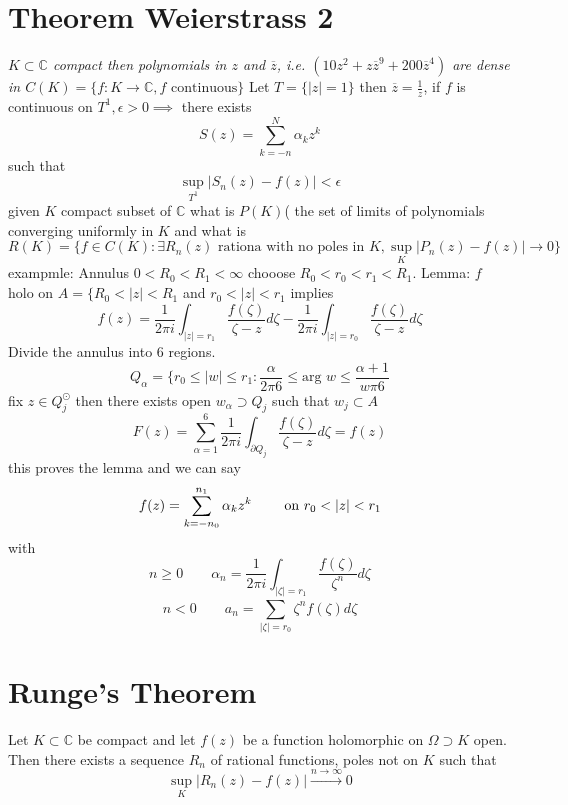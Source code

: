 \documentclass[11pt]{article}
\begin{document}
\section{Theorem Weierstrass 2}
\emph{
    $K \subset \mathbb{C}$  compact then polynomials in $z$ and  $\overline{ z}$, i.e. $(10z^2 + z \overline{z}^{9} + 200 \overline{z}^{4})$ are dense in $C(K) = \{f : K \rightarrow \mathbb{C}, f \text{ continuous}\}$
}
Let $T = \{|z| = 1\}$ then  $\overline{z} = \frac{1}{z}$, if $f$ is continuous on  $ T^{1}, \epsilon > 0 \implies$ there exists
\[
S(z) = \sum_{k=-n}^{N}\alpha_k z^{k}
\] 
such that
\[
    \sup_{T^{1}}|S_n(z) - f(z)|  < \epsilon
\] 
given $K$ compact subset of  $ \mathbb{C}$ what is $P(K)$( the set of limits of polynomials converging uniformly in  $ K$ and what is
\[
    R(K) = \{f  \in C(K): \exists  R_n(z) \text{ rationa with no poles in $K$}, \sup_{K}|P_n(z) - f(z)| \rightarrow 0\}
\] 
exampmle: Annulus $0 < R_0 < R_1 < \infty$ chooose $R_0 < r_0 < r_1 < R_1$.
Lemma: $f$ holo on $A = \{R_0 < |z| < R_1$ and $r_0 < |z| < r_1$ implies
\[
f(z) = \frac{1}{2\pi i}\int_{|z| = r_1}^{} \frac{f(\zeta)}{\zeta - z} d \zeta -\frac{1}{2\pi i} \int_{ |z|  = r_0}^{} \frac{f(\zeta)}{\zeta - z} d\zeta
\] 
Divide the annulus into 6 regions.
\[
    Q_\alpha = \{r_0 \le |w| \le r_1 : \frac{\alpha}{2\pi 6} \le \text{arg } w \le \frac{\alpha + 1}{w\pi 6}
\] 
fix $z \in Q_j^{\odot}$ then there exists open  $w_\alpha \supset Q_j$ such that $w_j \subset A$ 
\[
F(z) = \sum_{\alpha=1}^{6} \frac{1}{2\pi i} \int_{\partial Q_j}^{} \frac{f(\zeta)}{\zeta - z} d \zeta = f(z)
\] 
this proves the lemma and we can say
\[
    f(z) = \sum_{k=-n_0}^{n_1}\alpha_k z^{k} \qquad \text{ on $ r_0 < |z| < r_1$}
\] 
with
\[
n \ge 0 \qquad \alpha_n = \frac{1}{2\pi i} \int_{ |\zeta| = r_1}^{}\frac{f(\zeta)}{\zeta^{n}} d\zeta
\] 
\[
n < 0 \qquad a_n = \sum_{|\zeta|= r_0}^{}\zeta^{n}f(\zeta)d \zeta
\] 

\section{Runge's Theorem}
Let $K \subset \mathbb{C}$ be compact and let $f(z)$ be a function holomorphic on $\Omega \supset K$ open.
Then there exists a sequence  $ R_n$ of rational functions, poles not on  $K$ such that
 \[
     \sup_{K} |R_n(z) - f(z)| \xrightarrow{n \to \infty} 0
\] 
\end{document}
